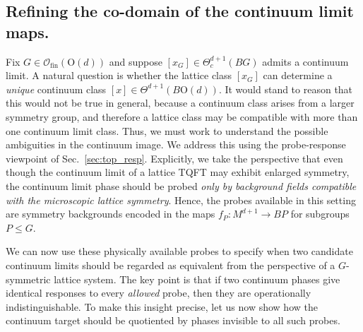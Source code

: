 \documentclass[aps,prx,reprint,superscriptaddress,twocolumn,amsmath,amssymb,amsfonts, nofootinbib]{revtex4-2}
\newcommand{\ofin}{\mathcal{O}_{\text{fin}}}
\theoremstyle{apsstyle}
\begin{document}
\subsection{Refining the co-domain of the continuum limit maps.}
\label{sec:refine_domain}


Fix $G\in\ofin(\mathrm{O}(d))$ and suppose $[x_G]\in \Theta^{d+1}_{c}(BG)$ admits a continuum limit. A natural question is whether the lattice class $[x_G]$ can determine a \emph{unique} continuum class $[x]\in\Theta^{d+1}(B\mathrm{O}(d))$. 
It would stand to reason that this would not be true in general, because a continuum class arises from a larger symmetry group, and therefore a lattice class may be compatible with more than one continuum limit class. Thus,  we must work to understand the possible ambiguities in the continuum image. 
We address this using the probe-response viewpoint of Sec.~\ref{sec:top_resp}. Explicitly, we take the perspective that even though the continuum limit of a lattice TQFT may exhibit enlarged symmetry, the continuum limit phase should be probed \emph{only by background fields compatible with the microscopic lattice symmetry}. Hence, the probes available in this setting are symmetry backgrounds encoded in the maps $f_P:M^{d+1}\to BP$ for subgroups $P\le G$. 

We can now use these physically available probes to specify when two candidate continuum limits should be regarded as equivalent from the perspective of a $G$-symmetric lattice system. The key point is that if two continuum phases give identical responses to every \emph{allowed} probe, then they are operationally indistinguishable. To make this insight precise, let us now show how the continuum target should be quotiented by phases invisible to all such probes.

\bigskip 
\end{document}
